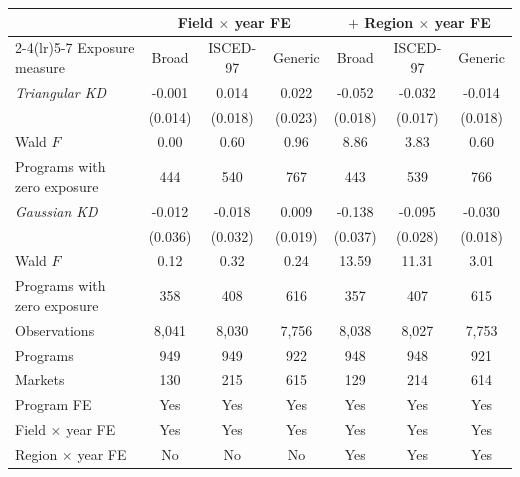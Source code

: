 \begin{tabular}{lcccccc}
\toprule
 & \multicolumn{3}{c}{Field \(\times\) year FE} & \multicolumn{3}{c}{\(+\) Region \(\times\) year FE} \\
\cmidrule(lr){2-4}\cmidrule(lr){5-7}
Exposure measure & Broad & ISCED-97 & Generic & Broad & ISCED-97 & Generic \\
\midrule
\textit{Triangular KD} & -0.001 &  0.014 &  0.022 & -0.052\sym{***} & -0.032\sym{*} & -0.014 \\
 & (0.014) & (0.018) & (0.023) & (0.018) & (0.017) & (0.018) \\
\quad Wald \(F\) &  0.00 &  0.60 &  0.96 &  8.86 &  3.83 &  0.60 \\
\quad Programs with zero exposure &       444 &       540 &       767 &       443 &       539 &       766 \\
\addlinespace
\textit{Gaussian KD} & -0.012 & -0.018 &  0.009 & -0.138\sym{***} & -0.095\sym{***} & -0.030\sym{*} \\
 & (0.036) & (0.032) & (0.019) & (0.037) & (0.028) & (0.018) \\
\quad Wald \(F\) &  0.12 &  0.32 &  0.24 & 13.59 & 11.31 &  3.01 \\
\quad Programs with zero exposure &       358 &       408 &       616 &       357 &       407 &       615 \\
\midrule
Observations &     8,041 &     8,030 &     7,756 &     8,038 &     8,027 &     7,753 \\
Programs &       949 &       949 &       922 &       948 &       948 &       921 \\
Markets &       130 &       215 &       615 &       129 &       214 &       614 \\
Program FE & Yes & Yes & Yes & Yes & Yes & Yes \\
Field \(\times\) year FE & Yes & Yes & Yes & Yes & Yes & Yes \\
Region \(\times\) year FE & No & No & No & Yes & Yes & Yes \\
\bottomrule
\end{tabular}
